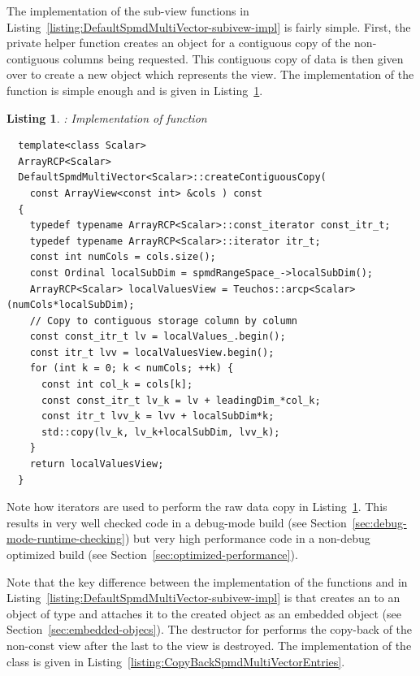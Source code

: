 \documentclass[pdf,ps2pdf,11pt]{SANDreport}
\newtheorem{listing}{Listing}
\begin{document}
The implementation of the sub-view functions in
Listing~\ref{listing:DefaultSpmdMultiVector-subivew-impl} is fairly
simple.  First, the private helper function
{}  creates an {}
object for a contiguous copy of the non-contiguous columns being
requested.  This contiguous copy of data is then given over to create
a new {} object which represents the view.
The implementation of the function {} 
is simple enough and is given in
Listing~\ref{listing:DefaultSpmdMultiVector-createContiguousCopy}.


{}\begin{listing}: Implementation of {}
function {}
\label{listing:DefaultSpmdMultiVector-createContiguousCopy}
{\small\begin{verbatim}
  template<class Scalar>
  ArrayRCP<Scalar>
  DefaultSpmdMultiVector<Scalar>::createContiguousCopy(
    const ArrayView<const int> &cols ) const
  {
    typedef typename ArrayRCP<Scalar>::const_iterator const_itr_t;
    typedef typename ArrayRCP<Scalar>::iterator itr_t;
    const int numCols = cols.size();
    const Ordinal localSubDim = spmdRangeSpace_->localSubDim();
    ArrayRCP<Scalar> localValuesView = Teuchos::arcp<Scalar>(numCols*localSubDim);
    // Copy to contiguous storage column by column
    const const_itr_t lv = localValues_.begin();
    const itr_t lvv = localValuesView.begin();
    for (int k = 0; k < numCols; ++k) {
      const int col_k = cols[k];
      const const_itr_t lv_k = lv + leadingDim_*col_k;
      const itr_t lvv_k = lvv + localSubDim*k;
      std::copy(lv_k, lv_k+localSubDim, lvv_k);
    }
    return localValuesView;
  }
\end{verbatim}}
\end{listing}


Note how iterators are used to perform the raw data copy in
Listing~\ref{listing:DefaultSpmdMultiVector-createContiguousCopy}.
This results in very well checked code in a debug-mode build (see
Section~\ref{sec:debug-mode-runtime-checking}) but very high
performance code in a non-debug optimized build (see
Section~\ref{sec:optimized-performance}).

Note that the key difference between the implementation of the
functions {} and
{} in
Listing~\ref{listing:DefaultSpmdMultiVector-subivew-impl} is that
{} creates an {} to an
object of type {} and attaches it
to the created {} object as
an embedded object (see Section~\ref{sec:embedded-objecs}).  The
destructor for {} performs the
copy-back of the non-const view after the last {} to the view
is destroyed.  The implementation of the class
{} is given in
Listing~\ref{listing:CopyBackSpmdMultiVectorEntries}.
\end{document}
